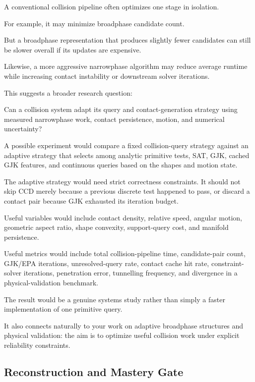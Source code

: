 A conventional collision pipeline often optimizes one stage in isolation.

For example, it may minimize broadphase candidate count.

But a broadphase representation that produces slightly fewer candidates can still be slower overall if its updates are expensive.

Likewise, a more aggressive narrowphase algorithm may reduce average runtime while increasing contact instability or downstream solver iterations.

This suggests a broader research question:

Can a collision system adapt its query and contact-generation strategy using measured narrowphase work, contact persistence, motion, and numerical uncertainty?

A possible experiment would compare a fixed collision-query strategy against an adaptive strategy that selects among analytic primitive tests, SAT, GJK, cached GJK features, and continuous queries based on the shapes and motion state.

The adaptive strategy would need strict correctness constraints. It should not skip CCD merely because a previous discrete test happened to pass, or discard a contact pair because GJK exhausted its iteration budget.

Useful variables would include contact density, relative speed, angular motion, geometric aspect ratio, shape convexity, support-query cost, and manifold persistence.

Useful metrics would include total collision-pipeline time, candidate-pair count, GJK/EPA iterations, unresolved-query rate, contact cache hit rate, constraint-solver iterations, penetration error, tunnelling frequency, and divergence in a physical-validation benchmark.

The result would be a genuine systems study rather than simply a faster implementation of one primitive query.

It also connects naturally to your work on adaptive broadphase structures and physical validation: the aim is to optimize useful collision work under explicit reliability constraints.

\subsection{Reconstruction and Mastery Gate}\label{04-visual-computing-ii-ch026-reconstruction-and-mastery-gate}

